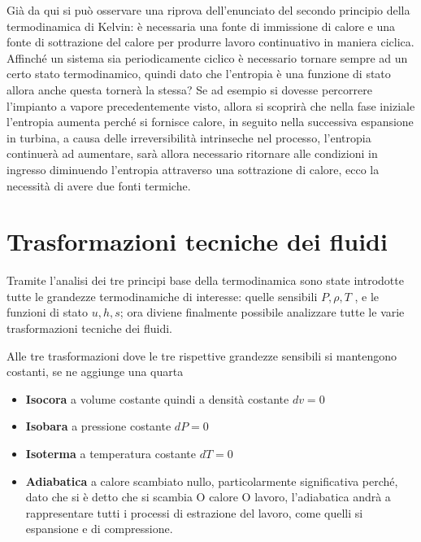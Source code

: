 \begin{adjustwidth}{2in}{}
	Già da qui si può osservare una riprova dell'enunciato del secondo principio della termodinamica di Kelvin: è necessaria una fonte di immissione di calore e una fonte di sottrazione del calore per produrre  lavoro continuativo in maniera ciclica. Affinché un sistema sia periodicamente ciclico è necessario tornare sempre ad un certo stato termodinamico, quindi dato che l'entropia è una funzione di stato allora anche questa tornerà la stessa? Se ad esempio si dovesse percorrere l'impianto a vapore precedentemente visto, allora si scoprirà che nella fase iniziale l'entropia aumenta perché si fornisce calore, in seguito nella successiva espansione in turbina, a causa delle irreversibilità intrinseche nel processo, l'entropia continuerà ad aumentare, sarà allora necessario ritornare alle condizioni in ingresso diminuendo l'entropia attraverso una sottrazione di calore,  ecco la necessità di avere due fonti termiche. 
	
	\section{Trasformazioni tecniche dei fluidi}
	
	Tramite l'analisi dei tre principi base della termodinamica sono state introdotte tutte le grandezze  termodinamiche di interesse: quelle sensibili $P,\rho,T$ , e le funzioni di stato  $u, h, s$; ora diviene finalmente possibile analizzare tutte le varie trasformazioni tecniche dei fluidi. \newline 
	
	Alle tre trasformazioni dove le tre rispettive grandezze sensibili si mantengono costanti, se ne aggiunge una quarta
	\begin{itemize}
	\item \textbf{Isocora} a volume costante quindi a densità costante $dv=0$
	\item \textbf{Isobara} a pressione costante $dP=0$
	\item \textbf{Isoterma} a temperatura costante $dT=0$
	\item \textbf{Adiabatica} a calore scambiato nullo, particolarmente significativa perché, dato che si è detto che si scambia O calore O lavoro, l'adiabatica andrà a rappresentare tutti i processi di estrazione del lavoro, come quelli si espansione e di compressione.
	\end{itemize} 
	
	\vspace{0.5cm}
	

\end{adjustwidth}
